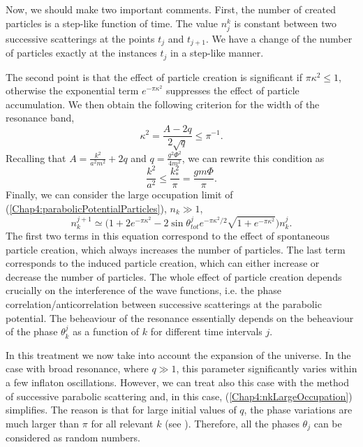 \documentclass[11pt,a4paper,twoside]{book}
\begin{document}
Now, we should make two important comments. First, the number of created particles is a step-like function of time. The value $ n_{j}^{k} $ is  constant between two successive scatterings at the points $ t_{j} $ and $ t_{j+1} $. We have a change of the number of particles exactly at the instances $ t_{j} $ in a step-like manner.

The second point is that the effect of particle creation is significant if $ \pi \kappa^{2} \le 1 $, otherwise the exponential term $ e^{-\pi\kappa^{2}} $ suppresses the effect of particle accumulation. We then obtain the following criterion for the width of the resonance band,
\begin{equation}
\label{Chap4:constraintResonanceBand}
\kappa^{2} = \frac{A-2q}{2\sqrt{q}} \le \pi^{-1}.
\end{equation}
Recalling that $ A=\frac{k^{2}}{a^{2}m^{2}} + 2q $ and $ q=\frac{g^{2}\Phi^{2}}{4m^{2}} $, we can rewrite this condition as
\begin{equation}
\label{Chap4:resonanceBand}
\frac{k^{2}}{a^{2}} \le \frac{k_{*}^{2}}{\pi} = \frac{gm\Phi}{\pi}.
\end{equation}
Finally, we can consider the large occupation limit of (\ref{Chap4:parabolicPotentialParticles}), $ n_{k} \gg 1 $,
\begin{equation}
	\label{Chap4:nkLargeOccupation}
	n_{k}^{j+1} \simeq \Bigg(1 + 2 e^{-\pi\kappa^{2}} -2\sin\theta^{j}_{tot}e^{-\pi\kappa^{2}/2}\sqrt{1+e^{-\pi\kappa^{2}}}\Bigg)n_{k}^{j}.
\end{equation}
The first two terms in this equation correspond to the effect of spontaneous particle creation, which always increases the number of particles. The last term corresponds to the induced particle creation, which can either increase or decrease the number of particles. The whole effect of particle creation depends crucially on the interference of the wave functions, i.e. the phase correlation/anticorrelation between successive scatterings at the parabolic potential. The beheaviour of the resonance essentially depends on the beheaviour of the phase $ \theta_{k}^{j} $ as a function of $ k $ for different time intervals $ j $.

In this treatment we now take into account the expansion of the universe. In the case with broad resonance, where $ q\gg 1 $, this parameter significantly varies within a few inflaton oscillations. However, we can treat also this case with the method of successive parabolic scattering and, in this case, (\ref{Chap4:nkLargeOccupation}) simplifies. The reason is that for large initial values of $ q $, the phase variations are much larger than $ \pi  $ for all relevant $ k $ (see \cite{Chap4:LindePreheatingModel}). Therefore, all the phases $ \theta_{j} $ can be considered as random numbers.
\end{document}
